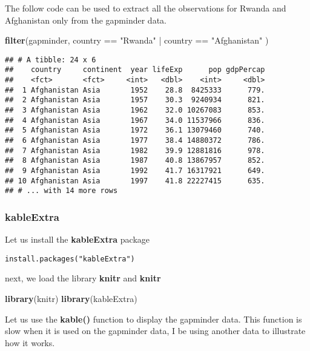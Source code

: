 \documentclass[]{article}
\newenvironment{Shaded}{\begin{snugshade}}{\end{snugshade}}
\newcommand{\KeywordTok}[1]{\textcolor[rgb]{0.13,0.29,0.53}{\textbf{{#1}}}}
\newcommand{\StringTok}[1]{\textcolor[rgb]{0.31,0.60,0.02}{{#1}}}
\newcommand{\NormalTok}[1]{{#1}}
\begin{document}
The follow code can be used to extract all the observations for Rwanda
and Afghanistan only from the gapminder data.

\begin{Shaded}
\begin{Highlighting}[]
 \KeywordTok{filter}\NormalTok{(gapminder, country ==}\StringTok{ "Rwanda"}  \NormalTok{|}\StringTok{ }\NormalTok{country ==}\StringTok{  "Afghanistan"} \NormalTok{)}
\end{Highlighting}
\end{Shaded}

\begin{verbatim}
## # A tibble: 24 x 6
##    country     continent  year lifeExp      pop gdpPercap
##    <fct>       <fct>     <int>   <dbl>    <int>     <dbl>
##  1 Afghanistan Asia       1952    28.8  8425333      779.
##  2 Afghanistan Asia       1957    30.3  9240934      821.
##  3 Afghanistan Asia       1962    32.0 10267083      853.
##  4 Afghanistan Asia       1967    34.0 11537966      836.
##  5 Afghanistan Asia       1972    36.1 13079460      740.
##  6 Afghanistan Asia       1977    38.4 14880372      786.
##  7 Afghanistan Asia       1982    39.9 12881816      978.
##  8 Afghanistan Asia       1987    40.8 13867957      852.
##  9 Afghanistan Asia       1992    41.7 16317921      649.
## 10 Afghanistan Asia       1997    41.8 22227415      635.
## # ... with 14 more rows
\end{verbatim}

\subsubsection{\texorpdfstring{\textbf{kableExtra}}{kableExtra}}\label{kableextra}

Let us install the \textbf{kableExtra} package

\begin{verbatim}
install.packages("kableExtra")
\end{verbatim}

next, we load the library \textbf{knitr} and \textbf{knitr}

\begin{Shaded}
\begin{Highlighting}[]
\KeywordTok{library}\NormalTok{(knitr)}
\KeywordTok{library}\NormalTok{(kableExtra)}
\end{Highlighting}
\end{Shaded}

Let us use the \textbf{kable()} function to display the gapminder data.
This function is slow when it is used on the gapminder data, I be using
another data to illustrate how it works.
\end{document}
